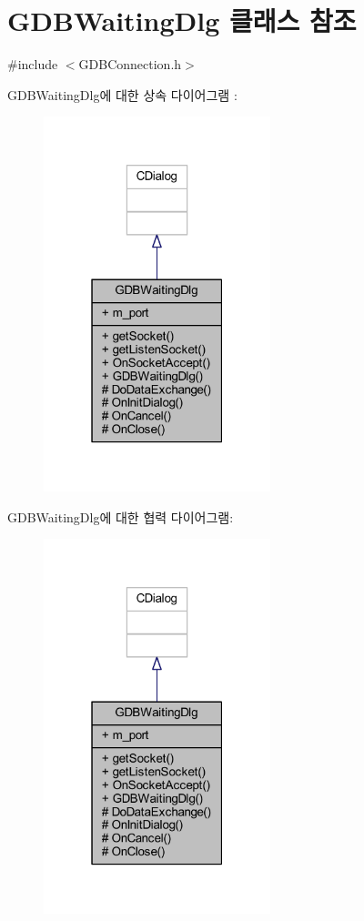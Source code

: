 \hypertarget{class_g_d_b_waiting_dlg}{}\section{G\+D\+B\+Waiting\+Dlg 클래스 참조}
\label{class_g_d_b_waiting_dlg}


{\ttfamily \#include $<$G\+D\+B\+Connection.\+h$>$}



G\+D\+B\+Waiting\+Dlg에 대한 상속 다이어그램 \+: \nopagebreak
\begin{figure}[H]
\begin{center}
\leavevmode
\includegraphics[width=187pt]{class_g_d_b_waiting_dlg__inherit__graph}
\end{center}
\end{figure}


G\+D\+B\+Waiting\+Dlg에 대한 협력 다이어그램\+:\nopagebreak
\begin{figure}[H]
\begin{center}
\leavevmode
\includegraphics[width=187pt]{class_g_d_b_waiting_dlg__coll__graph}
\end{center}
\end{figure}
